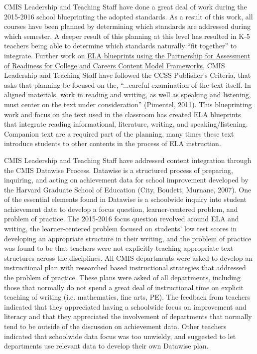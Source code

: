 \documentclass{report}
\begin{document}
\begin{findings}
CMIS Leadership and Teaching Staff have done a great deal of work during the 2015-2016 school blueprinting the adopted standards. As a result of this work, all courses have been planned by determining which standards are addressed during which semester. A deeper result of this planning at this level has resulted in K-5 teachers being able to determine which standards naturally ``fit together'' to integrate. Further work on \href{https://drive.google.com/drive/folders/0ByVFfrm0zfolfmV1QTNuWFdUVHV3dDVrRFMzUFBMazY0VGs1eWc0cmFjVGcwNDdsQkdrZzA?usp=sharing}{ELA blueprints using the Partnership for Assessment of Readiness for College and Careers Content Model Frameworks}, CMIS Leadership and Teaching Staff have followed the CCSS Publisher’s Criteria, that asks that planning be focused on the, ``...careful examination of the text itself. In aligned materials, work in reading and writing, as well as speaking and listening, must center on the text under consideration'' (Pimentel, 2011). This blueprinting work and focus on the text used in the classroom has created ELA blueprints that integrate reading informational, literature, writing, and speaking/listening. Companion text are a required part of the planning, many times these text introduce students to other contents in the process of ELA instruction. 


CMIS Leadership and Teaching Staff have addressed content integration through the CMIS Datawise Process. Datawise is a structured process of preparing, inquiring, and acting on achievement data for school improvement developed by the Harvard Graduate School of Education (City, Boudett, Murnane, 2007). One of the essential elements found in Datawise is a schoolwide inquiry into student achievement data to develop a focus question, learner-centered problem, and problem of practice. The 2015-2016 focus question revolved around ELA and writing, the learner-centered problem focused on students' low test scores in developing an appropriate structure in their writing, and the problem of practice was found to be that teachers were not explicitly teaching appropriate text structures across the disciplines. All CMIS departments were asked to develop an instructional plan with researched based instructional strategies that addressed the problem of practice. These plans were asked of all departments, including those that normally do not spend a great deal of instructional time on explicit teaching of writing (i.e. mathematics, fine arts, PE). The feedback from teachers indicated that they appreciated having a schoolwide focus on improvement and literacy and that they appreciated the involvement of departments that normally tend to be outside of the discussion on achievement data. Other teachers indicated that schoolwide data focus was too unwieldy, and suggested to let departments use relevant data to develop their own Datawise plan. 


\end{findings}
\end{document}
